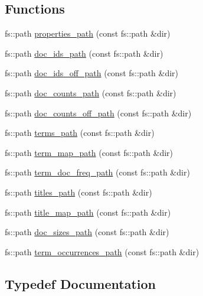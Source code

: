 \subsection*{Functions}
\begin{DoxyCompactItemize}
\item 
fs\+::path \mbox{\hyperlink{namespaceirk_1_1index_a1d229aa9c1efde2164015640a052886b}{properties\+\_\+path}} (const fs\+::path \&dir)
\item 
fs\+::path \mbox{\hyperlink{namespaceirk_1_1index_ac1625c6287b43b8f77d552c3340a2034}{doc\+\_\+ids\+\_\+path}} (const fs\+::path \&dir)
\item 
fs\+::path \mbox{\hyperlink{namespaceirk_1_1index_ae4d01a34d5e8b61eaef5cc0d21e18f10}{doc\+\_\+ids\+\_\+off\+\_\+path}} (const fs\+::path \&dir)
\item 
fs\+::path \mbox{\hyperlink{namespaceirk_1_1index_a3af7dfad46ca16b7e1c84fa625779605}{doc\+\_\+counts\+\_\+path}} (const fs\+::path \&dir)
\item 
fs\+::path \mbox{\hyperlink{namespaceirk_1_1index_a038babf1f6aece61737ccb3c5984d75e}{doc\+\_\+counts\+\_\+off\+\_\+path}} (const fs\+::path \&dir)
\item 
fs\+::path \mbox{\hyperlink{namespaceirk_1_1index_a5453ea8070a0840ba13036ebcdf24fc1}{terms\+\_\+path}} (const fs\+::path \&dir)
\item 
fs\+::path \mbox{\hyperlink{namespaceirk_1_1index_ae4e8075b119bc08aa63e10cbc03e8a0b}{term\+\_\+map\+\_\+path}} (const fs\+::path \&dir)
\item 
fs\+::path \mbox{\hyperlink{namespaceirk_1_1index_a18866e660d3b9982f7f3b9c79dc410c6}{term\+\_\+doc\+\_\+freq\+\_\+path}} (const fs\+::path \&dir)
\item 
fs\+::path \mbox{\hyperlink{namespaceirk_1_1index_a199554d3966dc8c076fc6c0c8d141784}{titles\+\_\+path}} (const fs\+::path \&dir)
\item 
fs\+::path \mbox{\hyperlink{namespaceirk_1_1index_ad633afa084d9b27887c07a4214c445a3}{title\+\_\+map\+\_\+path}} (const fs\+::path \&dir)
\item 
fs\+::path \mbox{\hyperlink{namespaceirk_1_1index_a73d3ee3bece3215c755469cf05b17deb}{doc\+\_\+sizes\+\_\+path}} (const fs\+::path \&dir)
\item 
fs\+::path \mbox{\hyperlink{namespaceirk_1_1index_ae4bdbf4ec595e47df214a7b1bea0a4b9}{term\+\_\+occurrences\+\_\+path}} (const fs\+::path \&dir)
\end{DoxyCompactItemize}


\subsection{Typedef Documentation}
\mbox{\label{namespaceirk_1_1index_af829dedea20da89f9b51b49d78f57006}} 
